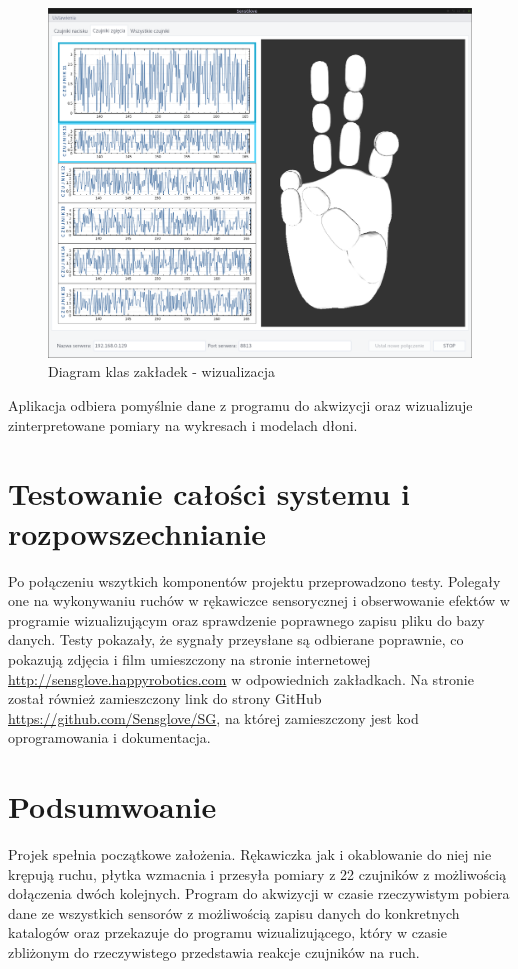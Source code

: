 \documentclass{article}
\begin{document}
\begin{figure}[H]
    \centering
    \includegraphics[width=18cm]{zakladka2.png}
    \caption{Diagram klas zakładek - wizualizacja}
    \label{rys:zakladka2}
\end{figure}



Aplikacja odbiera pomyślnie dane z programu do akwizycji oraz wizualizuje zinterpretowane pomiary na wykresach i modelach dłoni. 





\section{Testowanie całości systemu i rozpowszechnianie}
Po połączeniu wszytkich komponentów projektu przeprowadzono testy. Polegały one na wykonywaniu ruchów w rękawiczce sensorycznej i obserwowanie efektów w programie wizualizującym oraz sprawdzenie poprawnego zapisu pliku do bazy danych. Testy pokazały, że sygnały przeysłane są odbierane poprawnie, co pokazują zdjęcia i film umieszczony na stronie internetowej  \url{http://sensglove.happyrobotics.com} w odpowiednich zakładkach. Na stronie został również zamieszczony link do strony GitHub \url{https://github.com/Sensglove/SG}, na której zamieszczony jest kod oprogramowania i dokumentacja.

\section{Podsumwoanie}
Projek spełnia początkowe założenia. Rękawiczka jak i okablowanie do niej nie krępują ruchu, płytka wzmacnia i przesyła pomiary z 22 czujników z możliwością dołączenia dwóch kolejnych. Program do akwizycji w czasie rzeczywistym pobiera dane ze wszystkich sensorów z możliwością zapisu danych do konkretnych katalogów oraz przekazuje do programu wizualizującego, który w czasie zbliżonym do rzeczywistego przedstawia reakcje czujników na ruch.
\end{document}

